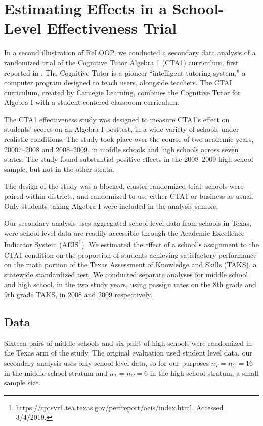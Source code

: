 \section{Estimating Effects in a School-Level Effectiveness Trial}
In a second illustration of ReLOOP, we conducted a secondary data
analysis of a randomized trial of the Cognitive Tutor Algebra 1 (CTA1)
curriculum, first reported in \citet{ctaiEval}.
The Cognitive Tutor is a pioneer ``intelligent tutoring system,''
a computer program designed to teach users, alongside teachers.
The CTAI curriculum, created by Carnegie Learning, combines the
Cognitive Tutor for Algebra I with a student-centered classroom
curriculum.

The CTA1 effectiveness study was designed to measure CTA1's effect on
students' scores on an Algebra I posttest, in a wide variety of
schools under realistic conditions.
The study took place over the course of two academic years,
20007--2008 and 2008--2009, in middle schools and high schools across
seven states.
The study found substantial positive effects in the 2008--2009 high
school sample, but not in the other strata.

The design of the study was a blocked, cluster-randomized trial:
schools were paired within districts, and randomized to use either
CTA1 or business as usual.
Only students taking Algebra I were included in the analysis sample.

Our secondary analysis uses aggregated school-level data from schools
in Texas, were school-level data are readily accessible through the
Academic Excellence Indicator
System (AEIS\footnote{\url{https://rptsvr1.tea.texas.gov/perfreport/aeis/index.html},
  Accessed 3/4/2019.}).
We estimated the effect of a school's assignment to the CTA1 condition
on the proportion of students achieving satisfactory performance on
the math portion of the Texas Assessment of Knowledge and Skills
(TAKS), a statewide standardized test.
We conducted separate analyses for middle school and high school, in
the two study years,
using passign rates on the 8th grade and 9th grade TAKS, in 2008 and 2009
respectively.

\subsection{Data}




Sixteen pairs of middle schools and six pairs of high schools were
randomized in the Texas arm of the study.
The original evaluation used student level data, our secondary
analysis uses only school-level data, so for our purposes $n_T=n_C=16$
in the middle school stratum and $n_T=n_C=6$ in the high school
stratum, a small sample size.

